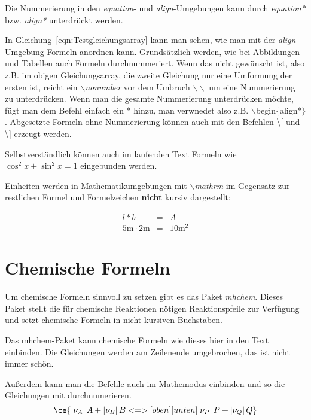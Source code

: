 Die Nummerierung in den \emph{equation}- und \emph{align}-Umgebungen kann durch \emph{equation*} bzw. \emph{align*} unterdrückt werden.

In Gleichung~\ref{eqn:Testgleichungsarray} kann man sehen, wie man mit der \emph{align}-Umgebung Formeln anordnen kann. Grundsätzlich werden, wie bei
Abbildungen und Tabellen auch Formeln durchnummeriert. Wenn das nicht gewünscht ist, also z.B. im obigen Gleichungsarray, die
zweite Gleichung nur eine Umformung der ersten ist, reicht ein \emph{$\backslash$nonumber} vor dem Umbruch \emph{$\backslash\backslash$} um eine Nummerierung zu
unterdrücken. Wenn man die gesamte Nummerierung unterdrücken möchte, fügt man dem Befehl einfach ein * hinzu, man verwnedet also z.B. $\backslash$begin$\{$align*$\}$.
Abgesetzte Formeln ohne Nummerierung können auch mit den Befehlen \textbackslash [ und \textbackslash ] erzeugt werden. 

Selbstverständlich können auch im laufenden Text Formeln wie
$\cos^{2}{x}+\sin^{2}{x}=1$ eingebunden werden.

Einheiten werden in Mathematikumgebungen mit
\emph{$\backslash$mathrm} im Gegensatz zur restlichen Formel und
Formelzeichen \textbf{nicht} kursiv dargestellt:

\begin{eqnarray}
  l * b &=& A \\
  5 \mathrm{m} \cdot 2 \mathrm{m} &=& 10 \mathrm{m^{2}}
\end{eqnarray}

\section{Chemische Formeln}

	Um chemische Formeln sinnvoll zu setzen gibt es das Paket \emph{mhchem}. Dieses Paket stellt die für chemische Reaktionen nötigen Reaktionspfeile zur Verfügung 
	und setzt chemische Formeln in nicht kursiven Buchstaben.
	
	Das mhchem-Paket kann chemische Formeln wie dieses hier  in den Text einbinden. 
	Die Gleichungen werden am Zeilenende umgebrochen, das ist nicht immer schön. 
	
	Außerdem kann man die Befehle auch im Mathemodus einbinden und so die Gleichungen mit durchnumerieren. 
		\begin{equation}
			\ce{|\nu_A|\, A + |\nu_B|\, B <=>[oben][unten] |\nu_P|\, P + |\nu_Q|\, Q}
		\end{equation}
	
